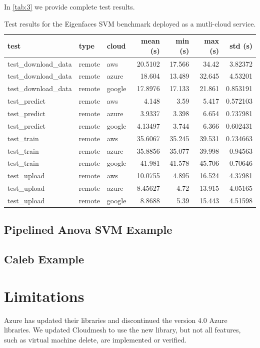 In \ref{tab:3} we provide complete test results.

\begin{table}[htb]
\caption{Test results for the Eigenfaces SVM benchmark deployed
  as a mutli-cloud service.}
\label{tabe:3}


\begin{tabular}[]{@{}lllrrrr@{}}
\toprule
test & type & cloud & mean (s) & min (s) & max (s) & std
(s)\tabularnewline
\midrule
test\_download\_data & remote & aws & 20.5102 & 17.566 & 34.42 &
3.82372\tabularnewline
test\_download\_data & remote & azure & 18.604 & 13.489 & 32.645 &
4.53201\tabularnewline
test\_download\_data & remote & google & 17.8976 & 17.133 & 21.861 &
0.853191\tabularnewline
test\_predict & remote & aws & 4.148 & 3.59 & 5.417 &
0.572103\tabularnewline
test\_predict & remote & azure & 3.9337 & 3.398 & 6.654 &
0.737981\tabularnewline
test\_predict & remote & google & 4.13497 & 3.744 & 6.366 &
0.602431\tabularnewline
test\_train & remote & aws & 35.6067 & 35.245 & 39.531 &
0.734663\tabularnewline
test\_train & remote & azure & 35.8856 & 35.077 & 39.998 &
0.94563\tabularnewline
test\_train & remote & google & 41.981 & 41.578 & 45.706 &
0.70646\tabularnewline
test\_upload & remote & aws & 10.0755 & 4.895 & 16.524 &
4.37981\tabularnewline
test\_upload & remote & azure & 8.45627 & 4.72 & 13.915 &
4.05165\tabularnewline
test\_upload & remote & google & 8.8688 & 5.39 & 15.443 &
4.51598\tabularnewline
\bottomrule
\end{tabular}
\end{table}

\subsection{Pipelined Anova SVM
Example}\label{pipelined-anova-svm-example}

\subsection{Caleb Example}\label{caleb-example}

\section{Limitations}\label{limitations}

Azure has updated their libraries and discontinued the version 4.0 Azure
libraries. We updated Cloudmesh to use the new library, but not all
features, such as virtual machine delete, are implemented or verified.

